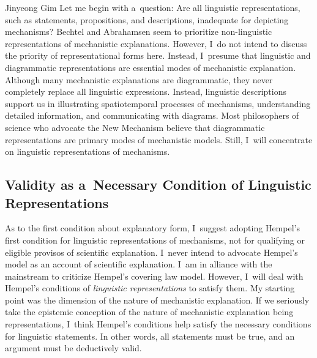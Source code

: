 \begin{artengenv}{Jinyeong Gim}
Let me begin with a~question: Are all linguistic representations, such as statements, propositions, and descriptions, inadequate for depicting mechanisms? Bechtel and Abrahamsen
\parencite*[][]{bechtel_explanation_2005} %
 seem to prioritize non-linguistic representations of mechanistic explanations. However, I~do not intend to discuss the priority of representational forms here. Instead, I~presume that linguistic and diagrammatic representations are essential modes of mechanistic explanation. Although many mechanistic explanations are diagrammatic, they never completely replace all linguistic expressions. Instead, linguistic descriptions support us in illustrating spatiotemporal processes of mechanisms, understanding detailed information, and communicating with diagrams. Most philosophers of science who advocate the New Mechanism believe that diagrammatic representations are primary modes of mechanistic models. Still, I~will concentrate on linguistic representations of mechanisms.

\subsection{Validity as a~Necessary Condition of Linguistic Representations}

As to the first condition about explanatory form, I~suggest adopting Hempel's first condition for linguistic representations of mechanisms, not for qualifying or eligible provisos of scientific explanation. I~never intend to advocate Hempel's model as an account of scientific explanation. I~am in alliance with the mainstream to criticize Hempel's covering law model. However, I~will deal with Hempel's conditions of \textit{linguistic representations} to satisfy them. My starting point was the dimension of the nature of mechanistic explanation. If we seriously take the epistemic conception of the nature of mechanistic explanation being representations, I~think Hempel's conditions help satisfy the necessary conditions for linguistic statements. In other words, all statements must be true, and an argument must be deductively valid.


\end{artengenv}
